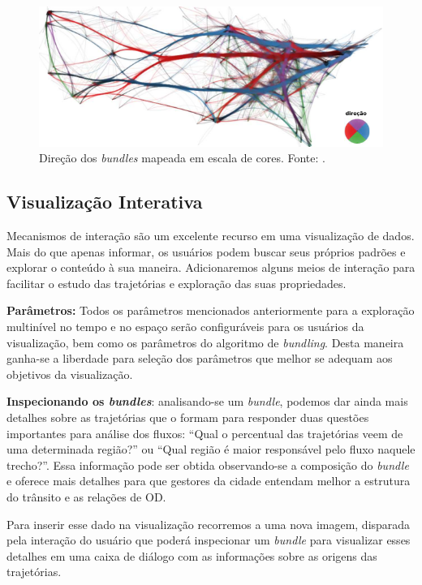 \begin{figure}[ht!]
  \centering
  \includegraphics[width=.8\textwidth]{../figuras/color-wheel.pdf}
  \caption[Direção dos \emph{bundles} mapeada em escalas de cores]{Direção dos \emph{bundles} mapeada em escala de cores. Fonte: \citet{Lhuillier2017}. \label{fig:direction}}
\end{figure}

\subsection{Visualização Interativa}

Mecanismos de interação são um excelente recurso em uma visualização de dados.
Mais do que apenas informar, os usuários podem buscar seus próprios padrões e
explorar o conteúdo à sua maneira. Adicionaremos alguns meios de interação para
facilitar o estudo das trajetórias e exploração das suas propriedades.

\textbf{Parâmetros:} Todos os parâmetros mencionados anteriormente para a exploração
multinível no tempo e no espaço serão configuráveis para os usuários da visualização,
bem como os parâmetros do algoritmo de \emph{bundling}. Desta maneira ganha-se
a liberdade para seleção dos parâmetros que melhor se adequam aos objetivos
da visualização.

\textbf{Inspecionando os \emph{bundles}}: analisando-se um \emph{bundle},
podemos dar ainda mais detalhes sobre as trajetórias que o formam para
responder duas questões importantes para análise dos fluxos: ``Qual o percentual
das trajetórias veem de uma determinada região?'' ou ``Qual região é maior
responsável pelo fluxo naquele trecho?''.  Essa informação pode ser obtida
observando-se a composição do \emph{bundle} e oferece mais detalhes para que
gestores da cidade entendam melhor a estrutura do trânsito e as relações de OD.

 Para inserir esse dado na visualização recorremos a uma nova
imagem, disparada pela interação do usuário que poderá inspecionar um
\emph{bundle} para visualizar esses detalhes em uma caixa de diálogo com as
informações sobre as origens das trajetórias.

